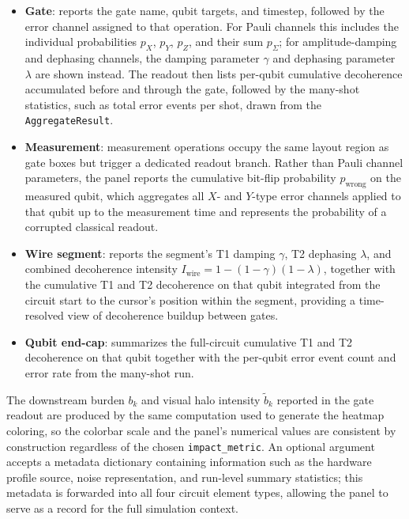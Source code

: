 \documentclass[10pt,twocolumn]{article}
\begin{document}
\begin{itemize}
    \item \textbf{Gate}: reports the gate name, qubit targets, and timestep,
    followed by the error channel assigned to that operation.
    For Pauli channels this includes the individual probabilities
    $p_X$, $p_Y$, $p_Z$, and their sum $p_\Sigma$; for amplitude-damping and
    dephasing channels, the damping parameter $\gamma$ and dephasing parameter
    $\lambda$ are shown instead.
    The readout then lists per-qubit cumulative decoherence accumulated before
    and through the gate, followed by the many-shot statistics, such as total error events per shot, drawn from the \texttt{AggregateResult}.

    \item \textbf{Measurement}: measurement operations occupy the same layout
    region as gate boxes but trigger a dedicated readout branch.
    Rather than Pauli channel parameters, the panel reports the cumulative
    bit-flip probability $p_\mathrm{wrong}$ on the measured qubit, which
    aggregates all $X$- and $Y$-type error channels applied to that qubit up
    to the measurement time and represents the probability of a corrupted
    classical readout.

    \item \textbf{Wire segment}: reports the segment's T1 damping $\gamma$,
    T2 dephasing $\lambda$, and combined decoherence intensity
    $I_\mathrm{wire} = 1 - (1-\gamma)(1-\lambda)$, together with the
    cumulative T1 and T2 decoherence on that qubit integrated from the circuit
    start to the cursor's position within the segment, providing a
    time-resolved view of decoherence buildup between gates.

    \item \textbf{Qubit end-cap}: summarizes the full-circuit cumulative T1
    and T2 decoherence on that qubit together with the per-qubit error event
    count and error rate from the many-shot run.
\end{itemize}

The downstream burden $b_k$ and visual halo intensity $\tilde{b}_k$
reported in the gate readout are produced by the same computation used to
generate the heatmap coloring, so the colorbar scale and the panel's
numerical values are consistent by construction regardless of the chosen
\texttt{impact\_metric}.
An optional argument accepts a metadata dictionary
containing information such as the hardware profile source, noise
representation, and run-level summary statistics; this metadata is forwarded
into all four circuit element types, allowing the panel to serve
as a record for the full simulation context.
\end{document}
